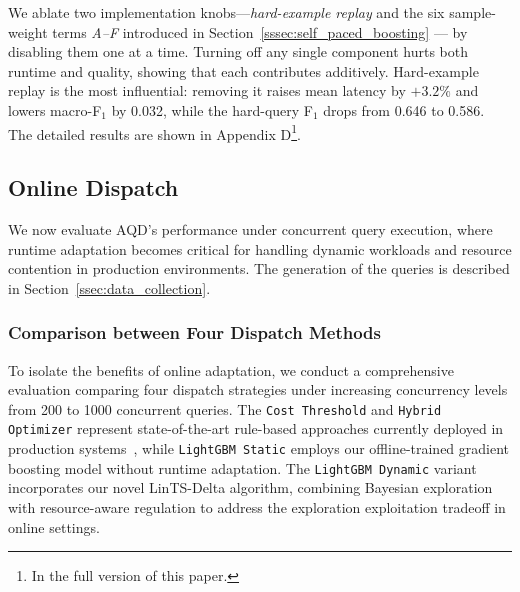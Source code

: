 \documentclass[sigconf, nonacm]{acmart}
\newcommand{\dispatcher}{AQD\xspace}
\begin{document}
We ablate two implementation knobs—\emph{hard-example replay} and the six
sample-weight terms \emph{A–F} introduced in
Section~\ref{sssec:self_paced_boosting} — by disabling them one at a time.
Turning off any single component hurts both runtime and quality,
showing that each contributes additively.  
Hard-example replay is the most influential: removing it raises mean
latency by \(+3.2\%\) and lowers macro-F\(_1\) by 0.032, while the
hard-query F\(_1\) drops from 0.646 to 0.586. The detailed results are shown in Appendix D\footnote{In the full version of this paper.}.


\subsection{Online Dispatch}
\label{subsec:online-dispatch}

We now evaluate \dispatcher's performance under concurrent query execution, where runtime adaptation becomes critical for handling dynamic workloads and resource contention in production environments. The generation of the queries is described in Section~\ref{ssec:data_collection}.

\subsubsection{Comparison between Four Dispatch Methods}
\label{subsubsec:static-vs-dynamic}
To isolate the benefits of online adaptation, we conduct a comprehensive evaluation comparing four dispatch strategies under increasing concurrency levels from 200 to 1000 concurrent queries. The \texttt{Cost Threshold} and \texttt{Hybrid Optimizer} represent state-of-the-art rule-based approaches currently deployed in production systems~\cite{wang2023polardb}, while \texttt{LightGBM Static} employs our offline-trained gradient boosting model without runtime adaptation. The \texttt{LightGBM Dynamic} variant incorporates our novel LinTS-Delta algorithm, combining Bayesian exploration with resource-aware regulation to address the exploration exploitation tradeoff in online settings.
\end{document}
